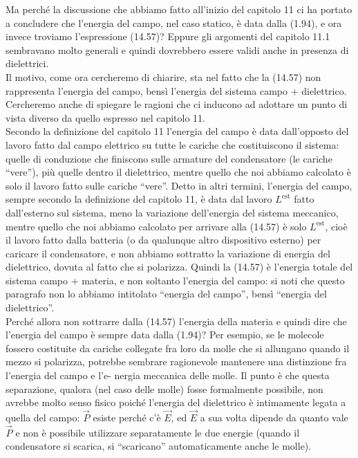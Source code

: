 Ma perch\'e la discussione che abbiamo fatto all'inizio del capitolo 11 ci ha
portato a concludere che l'energia del campo, nel caso statico, \`e data dalla
(1.94), e ora invece troviamo l'espressione (14.57)? Eppure gli argomenti del
capitolo 11.1 sembravano molto generali e quindi dovrebbero essere validi anche
in presenza di dielettrici.\\
Il motivo, come ora cercheremo di chiarire, sta nel fatto che la (14.57) non
rappresenta l'energia del campo, bens\`i l'energia del sistema campo +
dielettrico. Cercheremo anche di spiegare le ragioni che ci inducono ad adottare
un punto di vista diverso da quello espresso nel capitolo 11.\\
Secondo la definizione del capitolo 11 l'energia del campo \`e data dall'opposto
del lavoro fatto dal campo elettrico su tutte le cariche che costituiscono il
sistema: quelle di conduzione che finiscono sulle armature del condensatore (le
cariche ``vere''), pi\`u quelle dentro il dielettrico, mentre quello che noi
abbiamo calcolato \`e solo il lavoro fatto sulle cariche ``vere''. Detto in
altri termini, l'energia del campo, sempre secondo la definizione del capitolo
11, \`e data dal lavoro $L^\mathrm{est}$ fatto dall'esterno sul sistema, meno la
variazione dell'energia del sistema meccanico, mentre quello che noi abbiamo
calcolato per arrivare alla (14.57) \`e solo $L^\mathrm{est}$, cio\`e il lavoro
fatto dalla batteria (o da qualunque altro dispositivo esterno) per caricare il
condensatore, e non abbiamo sottratto la variazione di energia del dielettrico,
dovuta al fatto che si polarizza. Quindi la (14.57) \`e l'energia totale del
sistema campo + materia, e non soltanto l'energia del campo: si noti che questo
paragrafo non lo abbiamo intitolato ``energia del campo'', bens\`i ``energia del
dielettrico''.\\
Perch\'e allora non sottrarre dalla (14.57) l'energia della materia e quindi
dire che l'energia del campo \`e sempre data dalla (1.94)? Per esempio, se le
molecole fossero costituite da cariche collegate fra loro da molle che si
allungano quando il mezzo si polarizza, potrebbe sembrare ragionevole mantenere
una distinzione fra l'energia del campo e l'e-
nergia meccanica delle molle. Il punto \`e che questa separazione, qualora (nel
caso delle molle) fosse formalmente possibile, non avrebbe molto senso fisico
poich\'e l'energia del dielettrico \`e intimamente legata a quella del campo:
$\vec P$ esiste perch\'e c'\`e $\vec E$, ed $\vec E$ a sua volta dipende da
quanto vale $\vec P$ e non \`e possibile utilizzare separatamente le due energie
(quando il condensatore si scarica, si ``scaricano'' automaticamente anche le
molle).

